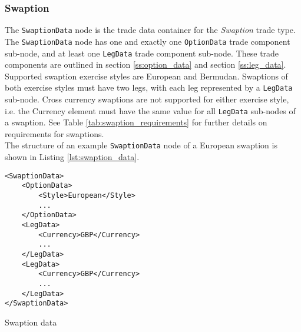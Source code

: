 \subsubsection{Swaption}

The \lstinline!SwaptionData!  node is the trade data container for the \emph{Swaption} trade type. The \lstinline!SwaptionData!
node has one and exactly one \lstinline!OptionData! trade component sub-node, and at least one \lstinline!LegData! trade
component sub-node.  These trade components are outlined in section \ref{ss:option_data} and section
\ref{ss:leg_data}.\\
\vspace{5mm}
Supported swaption exercise styles are European and Bermudan.  Swaptions of both exercise styles must have two legs, with
each leg represented by a \lstinline!LegData! sub-node.  Cross currency swaptions are not supported for either exercise style, i.e. the Currency element must
have the same value for all \lstinline!LegData! sub-nodes of a swaption. See Table \ref{tab:swaption_requirements} for further details on requirements for
 swaptions.\\
\vspace{5mm}
The structure of an example \lstinline!SwaptionData!  node of a European swaption is shown in Listing
\ref{lst:swaption_data}.

\begin{listing}[H]
\begin{verbatim}
<SwaptionData>
    <OptionData>
        <Style>European</Style>
        ...
    </OptionData>
    <LegData>
        <Currency>GBP</Currency>
        ...
    </LegData>
    <LegData>
        <Currency>GBP</Currency>
        ...
    </LegData>
</SwaptionData>
\end{verbatim}
\caption{Swaption data}
\label{lst:swaption_data}
\end{listing}

